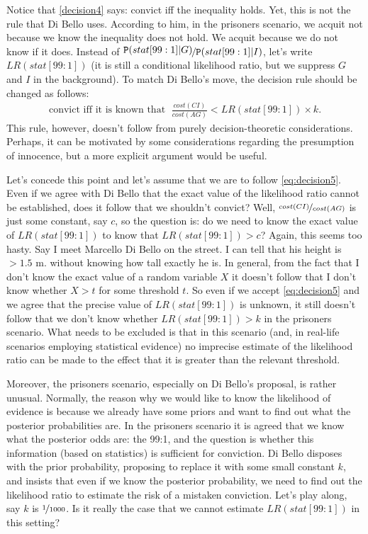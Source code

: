 \documentclass{article}
\newcommand{\pr}[1]{\mbox{$\mathtt{P}(#1)$}}
\begin{document}
\noindent  Notice that \eqref{decision4} says: convict iff the inequality holds. Yet, this is  not the rule that  Di Bello uses. According to him, in the prisoners scenario, we acquit not because we know the inequality does not hold. We acquit because we do not know if it does. 
Instead of $\nicefrac{\pr{stat[99:1]\vert G}}{\pr{stat[99:1]\vert I}}$, let's write $LR(stat[99:1])$ (it is still a conditional likelihood ratio, but we suppress $G$ and $I$ in the background).
To match Di Bello's move, the decision rule should be changed as follows:
\begin{align}\label{eq:decision5}
\text{convict iff it is known that}\;\,\, \frac{cost(CI)}{cost(AG)}<LR(stat[99:1])\times k.
\end{align}	
\noindent This rule, however, doesn't follow from purely decision-theoretic considerations. Perhaps, it can be motivated by some considerations regarding the presumption of innocence, but a more explicit argument would be useful.

Let's concede this point and let's assume that we are to follow \eqref{eq:decision5}. Even if we agree with Di Bello that the exact value of the likelihood ratio cannot be established, does it follow that we shouldn't convict? Well, $\nicefrac{cost(CI)}{cost(AG)}$ is just some constant, say $c$, so the question is: do we need to know the exact value of  $LR(stat[99:1])$ to know that $LR(stat[99:1])>c$? Again, this seems too hasty. Say I meet Marcello Di Bello on the street. I can tell that his height is $>1.5$ m. without knowing how tall exactly he is. In general, from the fact that I don't know the exact value of a random variable $X$ it doesn't follow that I don't know whether $X>t$ for some threshold $t$. So even if we accept \eqref{eq:decision5} and we agree that the precise value of $LR(stat[99:1])$ is unknown, it still doesn't follow that we don't know whether $LR(stat[99:1])>k$ in the prisoners scenario. What needs to be excluded is that in this scenario (and, in real-life scenarios employing statistical evidence) no imprecise estimate of the likelihood ratio can be made to the effect that it is greater than the relevant threshold.


Moreover, the prisoners scenario, especially on Di Bello's proposal, is rather unusual. Normally, the reason why we would like to know the likelihood of evidence is because we already have some priors and want to find out what the posterior probabilities are. In the prisoners scenario it is agreed that we know what the posterior odds are: the 99:1, and the  question is whether this information (based on statistics) is sufficient for conviction.  Di Bello disposes with the prior probability, proposing to replace it with some small constant $k$, and insists that even if we know the posterior probability, we need to find out the likelihood ratio to estimate the risk of a mistaken conviction. Let's play along,  say $k$ is $\nicefrac{1}{1000}$. Is it really the case that we cannot estimate $LR(stat[99:1])$ in this setting? 
\end{document}
